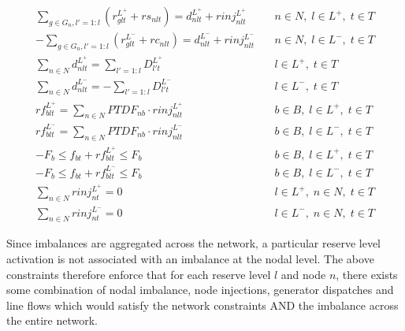\documentclass[number,times]{elsarticle}
\begin{document}
\begin{align}
    \sum_{g \in G_n, l'=1:l} (r^{L^+}_{glt} + rs_{nlt}) = d^{L^+}_{nlt} + rinj^{L^+}_{nlt}   & \quad n \in N, \; l \in L^+, \; t \in T \label{eq:reserve_network_activation_constraints_1} \\
    - \sum_{g \in G_n, l'=1:l} (r^{L^-}_{glt} + rc_{nlt}) = d^{L^-}_{nlt} + rinj^{L^-}_{nlt} & \quad n \in N, \; l \in L^-, \; t \in T                                                     \\
    \sum_{n \in N} d^{L^+}_{nlt} = \sum_{l'=1:l} D^{L^+}_{l't}                               & \quad l \in L^+, \; t \in T                                                                 \\
    \sum_{n \in N} d^{L^-}_{nlt} = - \sum_{l'=1:l} D^{L^-}_{l't}                             & \quad l \in L^-, \; t \in T                                                                 \\
    rf^{L^+}_{blt} = \sum_{n \in N} PTDF_{nb} \cdot rinj^{L^+}_{nlt}                         & \quad b \in B, \; l \in L^+, \; t \in T                                                     \\
    rf^{L^-}_{blt} = \sum_{n \in N} PTDF_{nb} \cdot rinj^{L^-}_{nlt}                         & \quad b \in B, \; l \in L^-, \; t \in T                                                     \\
    -F_{b} \leq f_{bt} + rf^{L^+}_{blt} \leq F_b                                             & \quad b \in B, \; l \in L^+, \; t \in T                                                     \\
    -F_{b} \leq f_{bt} + rf^{L^-}_{blt} \leq F_b                                             & \quad b \in B, \; l \in L^-, \; t \in T                                                     \\
    \sum_{n \in N} rinj^{L^+}_{nt} = 0                                                       & \quad l \in L^+, \; n \in N, \; t \in T                                                     \\
    \sum_{n \in N} rinj^{L^-}_{nt} = 0                                                       & \quad l \in L^-, \; n \in N, \; t \in T \label{eq:reserve_network_activation_constraints_2}
\end{align}

Since imbalances are aggregated across the network, a particular reserve level activation is not associated with an imbalance at the nodal level. The above constraints therefore enforce that for each reserve level $l$ and node $n$, there exists some combination of nodal imbalance, node injections, generator dispatches and line flows which would satisfy the network constraints AND the imbalance across the entire network.
\end{document}
